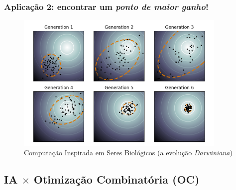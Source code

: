 \documentclass{beamer}
\begin{document}

\begin{frame}

\frametitle{Aplicação 2: encontrar um \textit{ponto de maior ganho}!}

\begin{figure}[ht!]
 \centering
 \includegraphics[width=0.9\textwidth , height=0.7\textheight]{figures/optimization_ant_colony_algorithm.png}

\caption{Computação Inspirada em Seres Biológicos (a evolução \textit{Darwiniana})} 
\end{figure}
  

\end{frame}


\subsection{IA $\times $ Otimização Combinatória (OC)}
\end{document}
